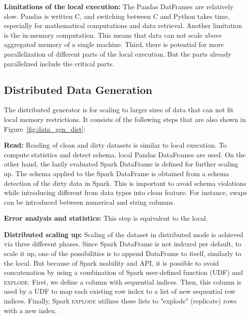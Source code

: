 \textbf{Limitations of the local execution:} 
The Pandas DatFrames are relatively slow. Pandas is written C, and switching between C and Python takes time, especially for mathematical computations and data retrieval.
Another limitation is the in-memory computation. This means that data can not scale above aggregated memory of a single machine.
Third, there is potential for more parallelization of different parts of the local execution. But the parts already parallelized include the critical parts.


\subsection{Distributed Data Generation}
\label{sec:distributed_generator}

The distributed generator is for scaling to larger sizes of data that can not fit local memory restrictions.
It consists of the following steps that are also shown in Figure~\ref{fig:data_gen_dist}:

\textbf{Read:} 
Reading of clean and dirty datasets is similar to local execution. 
To compute statistics and detect schema, local Pandas DataFrames are used. 
On the other hand, the lazily evaluated Spark DataFrame is defined for further scaling up.
The schema applied to the Spark DataFrame is obtained from a schema detection of the dirty data in Spark.
This is important to avoid schema violations while introducing different from data types into clean feature.  
For instance, swaps can be introduced between numerical and string columns.

\textbf{Error analysis and statistics: } This step is equivalent to the local.

\textbf{Distributed scaling up:}
Scaling of the dataset in distributed mode is achieved via three different phases. 
Since Spark DataFrame is not indexed per default, to scale it up, one of the possibilities is to append DataFrame to itself, similarly to the local.
But because of Spark usability and API, it is possible to avoid concatenation by using a combination of Spark user-defined function (\textsc{UDF}) and \textsc{explode}.
First, we define a column with sequential indices. 
Then, this column is used by a \textsc{UDF} to map each existing row index to a list of new sequential row indices.
Finally, Spark \textsc{explode} utilizes these lists to "explode" (replicate) rows with a new index.

